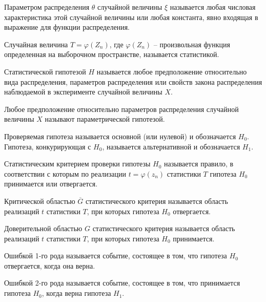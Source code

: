 \documentclass[12pt]{article}
\begin{document}
\begin{definition}
    Параметром распределения $\theta$ случайной величины $\xi$ называется любая числовая характеристика этой случайной величины или любая константа, явно входящая в выражение для функции распределения.
\end{definition}
\begin{definition}
    Случайная величина $T=\varphi(Z_n)$, где $\varphi(Z_n)$ – произвольная функция определенная на выборочном пространстве, называется статистикой.
\end{definition}
\begin{definition}
    Статистической гипотезой $H$ называется любое предположение относительно вида распределения, параметров распределения или свойств закона распределения наблюдаемой в эксперименте случайной величины $X$.
\end{definition}
\begin{definition}
    Любое предположение относительно параметров распределения случайной величины $X$ называют параметрической гипотезой.
\end{definition}
\begin{definition}
    Проверяемая гипотеза называется основной (или нулевой) и обозначается $H_0$. Гипотеза, конкурирующая с $H_0$, называется альтернативной и обозначается $H_1$.
\end{definition}
\begin{definition}
    Статистическим критерием проверки гипотезы $H_0$ называется правило, в соответствии с которым по реализации $t=\varphi(z_n)$ статистики $T$ гипотеза $H_0$ принимается или отвергается.
\end{definition}
\begin{definition}
    Критической областью $\overline{G}$ статистического критерия называется область реализаций $t$ статистики $T$, при которых гипотеза $H_0$ отвергается.
\end{definition}
\begin{definition}
    Доверительной областью $G$ статистического критерия называется область реализаций $t$ статистики $T$, при которых гипотеза $H_0$ принимается.
\end{definition}
\begin{definition}
    Ошибкой 1-го рода называется событие, состоящее в том, что гипотеза $H_0$ отвергается, когда она верна.
\end{definition}
\begin{definition}
    Ошибкой 2-го рода называется событие, состоящее в том, что принимается гипотеза $H_0$, когда верна гипотеза $H_1$.
\end{definition}
\end{document}
